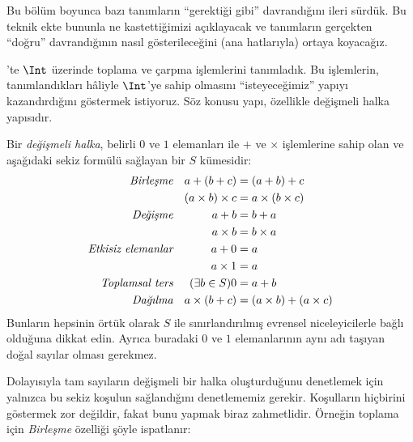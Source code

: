
	

Bu bölüm boyunca bazı tanımların “gerektiği gibi” davrandığını ileri sürdük.
Bu teknik ekte bununla ne kastettiğimizi açıklayacak ve tanımların gerçekten
“doğru” davrandığının nasıl gösterileceğini (ana hatlarıyla) ortaya koyacağız.

'te $\Int$ üzerinde toplama ve çarpma işlemlerini tanımladık.
Bu işlemlerin, tanımlandıkları hâliyle $\Int$'ye sahip olmasını
“isteyeceğimiz” yapıyı kazandırdığını göstermek istiyoruz. Söz konusu yapı,
özellikle değişmeli halka yapısıdır.

\begin{defn}
	Bir \emph{değişmeli halka}, belirli $0$ ve $1$ elemanları ile $+$ ve
	$\times$ işlemlerine sahip olan ve aşağıdaki sekiz formülü sağlayan bir
	$S$ kümesidir:
	\begin{align*}
		\emph{Birleşme}&&a + (b+ c) & = (a + b) + c \\
		&& (a \times b) \times c & = a \times (b\times c)\\
		\emph{Değişme}&&a + b &= b+ a  \\
		&&  a \times b&= b\times a\\
		\emph{Etkisiz elemanlar}&&a + 0 &= a \\
		&& a \times 1 &= a\\
		\emph{Toplamsal ters}&&(\exists b\in S)0&=a + b\\
		\emph{Dağılma}&&a \times (b+ c ) &= (a \times b) + (a \times c)
	\end{align*}
	Bunların hepsinin örtük olarak $S$ ile sınırlandırılmış evrensel
	niceleyicilerle bağlı olduğuna dikkat edin. Ayrıca buradaki $0$ ve $1$
	elemanlarının aynı adı taşıyan doğal sayılar olması gerekmez.
\end{defn}

Dolayısıyla tam sayıların değişmeli bir halka oluşturduğunu denetlemek için
yalnızca bu sekiz koşulun sağlandığını denetlememiz gerekir. Koşulların
hiçbirini göstermek {zor} değildir, fakat bunu yapmak biraz zahmetlidir.
Örneğin toplama için \emph{Birleşme} özelliği şöyle ispatlanır:

